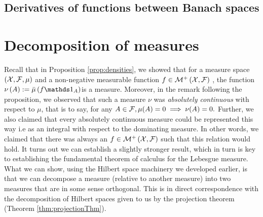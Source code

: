 \subsection{Derivatives of functions between Banach spaces}

\section{Decomposition of measures}

Recall that in Proposition \ref{prop:densities}, we showed that for
a measure space $\left(\mathcal{X},\mathcal{F},\mu\right)$ and a non-negative measurable
function $f\in\mathcal{M}^{+}\left(\mathcal{X},\mathcal{F}\right)$ , the function $\nu\left(A\right):=\lebInt{\mu}{f\indicate_{A}}$is
a measure. Moreover, in the remark following the proposition, we observed
that such a measure $\nu$ was \emph{absolutely continuous }with respect
to $\mu$, that is to say, for any $A\in\mathcal{F},\mu(A)=0\implies\nu(A)=0.$
Further, we also claimed that every absolutely continuous measure
could be represented this way i.e as an integral with respect to the
dominating measure. In other words, we claimed that there was always
an $f\in\mathcal{M}^{+}\left(\mathcal{X},\mathcal{F}\right)$ such that this relation would
hold. It turns out we can establish a slightly stronger result, which
in turn is key to establishing the fundamental theorem of calculus
for the Lebesgue measure. What we can show, using the Hilbert space
machinery we developed earlier, is that we can decompose a measure
(relative to another measure) into two measures that are in some sense
orthogonal. This is in direct correspondence with the decomposition
of Hilbert spaces given to us by the projection theorem (Theorem \ref{thm:projectionThm}).

